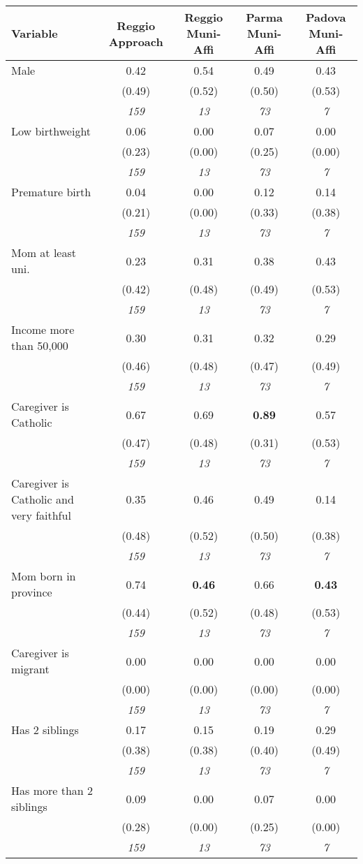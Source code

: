 \begin{tabular}{lcccc}
\toprule
 Variable & Reggio Approach & Reggio Muni-Affi & Parma Muni-Affi & Padova Muni-Affi \\
\midrule
Male & 0.42 & 0.54 & 0.49 & 0.43 \\
 & (0.49) & (0.52) & (0.50) & (0.53) \\
 & \textit{159} & \textit{13} & \textit{73} & \textit{7} \\
Low birthweight & 0.06 & 0.00 & 0.07 & 0.00 \\
 & (0.23) & (0.00) & (0.25) & (0.00) \\
 & \textit{159} & \textit{13} & \textit{73} & \textit{7} \\
Premature birth & 0.04 & 0.00 & 0.12 & 0.14 \\
 & (0.21) & (0.00) & (0.33) & (0.38) \\
 & \textit{159} & \textit{13} & \textit{73} & \textit{7} \\
Mom at least uni. & 0.23 & 0.31 & 0.38 & 0.43 \\
 & (0.42) & (0.48) & (0.49) & (0.53) \\
 & \textit{159} & \textit{13} & \textit{73} & \textit{7} \\
Income more than 50,000 & 0.30 & 0.31 & 0.32 & 0.29 \\
 & (0.46) & (0.48) & (0.47) & (0.49) \\
 & \textit{159} & \textit{13} & \textit{73} & \textit{7} \\
Caregiver is Catholic & 0.67 & 0.69 & \textbf{0.89} & 0.57 \\
 & (0.47) & (0.48) & (0.31) & (0.53) \\
 & \textit{159} & \textit{13} & \textit{73} & \textit{7} \\
Caregiver is Catholic and very faithful & 0.35 & 0.46 & 0.49 & 0.14 \\
 & (0.48) & (0.52) & (0.50) & (0.38) \\
 & \textit{159} & \textit{13} & \textit{73} & \textit{7} \\
Mom born in province & 0.74 & \textbf{0.46} & 0.66 & \textbf{0.43} \\
 & (0.44) & (0.52) & (0.48) & (0.53) \\
 & \textit{159} & \textit{13} & \textit{73} & \textit{7} \\
Caregiver is migrant & 0.00 & 0.00 & 0.00 & 0.00 \\
 & (0.00) & (0.00) & (0.00) & (0.00) \\
 & \textit{159} & \textit{13} & \textit{73} & \textit{7} \\
Has 2 siblings & 0.17 & 0.15 & 0.19 & 0.29 \\
 & (0.38) & (0.38) & (0.40) & (0.49) \\
 & \textit{159} & \textit{13} & \textit{73} & \textit{7} \\
Has more than 2 siblings & 0.09 & 0.00 & 0.07 & 0.00 \\
 & (0.28) & (0.00) & (0.25) & (0.00) \\
 & \textit{159} & \textit{13} & \textit{73} & \textit{7} \\
\bottomrule
\end{tabular}
